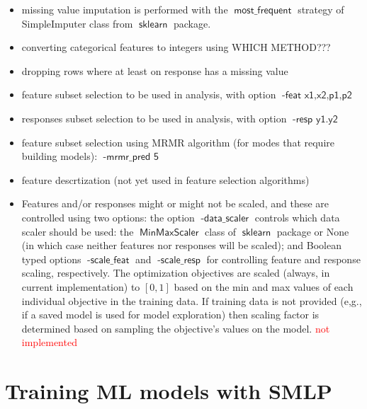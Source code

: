 \documentclass[a4paper,parskip=half]{article} %
\newcommand*\option[1]{\operatorname{\mathsf{#1}}} %
\newcommand*\package[1]{\operatorname{\mathsf{#1}}} %
\newcommand\todozk[1]{\textcolor{red}{#1}}
\newcommand*\ZK{\todozk}
\begin{document}
\begin{itemize}
\item missing value imputation is performed with the $\option{most\_frequent}$ strategy of 
SimpleImputer class from $\package{sklearn}$ package. 
\item converting categorical features to integers using WHICH METHOD???
\item dropping rows where at least on response has a missing value
\item feature subset selection to be used in analysis, with option $\option{-feat\,\, x1,x2,p1,p2}$
\item responses subset selection to be used in analysis, with option $\option{-resp \,\,y1. y2}$
\item feature subset selection using MRMR algorithm (for modes that require building models):  
$\option{-mrmr\_pred \,\,5}$
\item feature descrtization (not yet used in feature selection algorithms)
\item Features and/or responses might or might not be scaled, and these are controlled using two options:
the option $\option{-data\_scaler}$  controls which data scaler should be used: the $\option{MinMaxScaler}$ 
class of $\package{sklearn}$ package or None (in which case neither features nor responses will be scaled); 
and Boolean typed options $\option{-scale\_feat}$ and $\option{-scale\_resp}$ for controlling feature and 
response scaling, respectively.
The optimization objectives are scaled (always,  in current implementation) to $[0,1]$ based on the min and max 
values of each individual objective in the training data. If training data is not provided (e,g., if a saved model is 
used for model exploration) then scaling factor is determined based on sampling the objective's values on the model.
\ZK{not implemented}
\end{itemize}

\section{Training ML models with SMLP}\label{sec:models}
\end{document}
